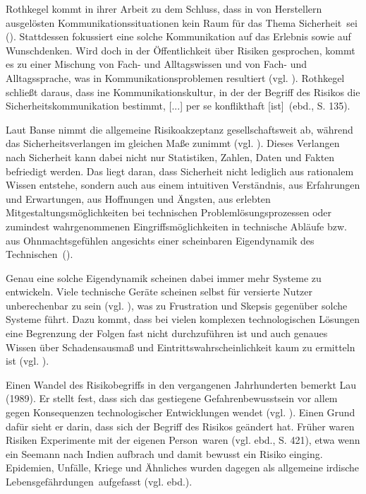 Rothkegel kommt in ihrer Arbeit zu dem Schluss, dass in von Herstellern ausgelösten Kommunikationssituationen \glqq kein Raum für das Thema Sicherheit\grqq \, sei (\cite[132]{rothkegel2013sicherheitskommunikation}). Stattdessen fokussiert eine solche Kommunikation auf das Erlebnis sowie auf Wunschdenken. Wird doch in der Öffentlichkeit über Risiken gesprochen, kommt es zu einer Mischung von Fach- und Alltagswissen und von Fach- und Alltagssprache, was in Kommunikationsproblemen resultiert (vgl. \cite[134]{rothkegel2013sicherheitskommunikation}). Rothkegel schließt daraus, dass \glqq [e]ine Kommunikationskultur, in der der Begriff des Risikos die Sicherheitskommunikation bestimmt, [...] per se konflikthaft [ist]\grqq \, (ebd., S. 135).

Laut Banse nimmt die allgemeine Risikoakzeptanz gesellschaftsweit ab, während das Sicherheitsverlangen im gleichen Maße zunimmt (vgl. \cite[3]{banse2018technik}). Dieses Verlangen nach Sicherheit kann dabei nicht nur Statistiken, Zahlen, Daten und Fakten befriedigt werden. Das liegt daran, dass Sicherheit nicht lediglich aus rationalem Wissen entstehe, sondern auch aus \glqq einem intuitiven Verständnis, aus Erfahrungen und Erwartungen, aus Hoffnungen und Ängsten, aus erlebten Mitgestaltungsmöglichkeiten bei technischen Problemlösungsprozessen oder zumindest wahrgenommenen Eingriffsmöglichkeiten in technische Abläufe bzw. aus Ohnmachtsgefühlen angesichts einer scheinbaren Eigendynamik des Technischen\grqq \, (\cite[4]{banse2018technik}).

Genau eine solche Eigendynamik scheinen dabei immer mehr Systeme zu entwickeln. Viele technische Geräte scheinen selbst für versierte Nutzer unberechenbar zu sein (vgl. \cite[5]{norman2013design}), was zu Frustration und Skepsis gegenüber solche Systeme führt. Dazu kommt, dass bei vielen komplexen technologischen Lösungen eine Begrenzung der Folgen fast nicht durchzuführen ist und auch genaues Wissen über Schadensausmaß und Eintrittswahrscheinlichkeit kaum zu ermitteln ist (vgl. \cite[12]{banse2018technik}).

Einen Wandel des Risikobegriffs in den vergangenen Jahrhunderten bemerkt Lau (1989). Er stellt fest, dass sich das gestiegene Gefahrenbewusstsein vor allem gegen Konsequenzen technologischer Entwicklungen wendet (vgl. \cite[418]{lau1989risikodiskurse}). Einen Grund dafür sieht er darin, dass sich der Begriff des Risikos geändert hat. Früher waren Risiken \glqq Experimente mit der eigenen Person\grqq \, waren (vgl. ebd., S. 421), etwa wenn ein Seemann nach Indien aufbrach und damit bewusst ein Risiko einging. Epidemien, Unfälle, Kriege und Ähnliches wurden dagegen als \glqq allgemeine irdische Lebensgefährdungen\grqq \, aufgefasst (vgl. ebd.).

